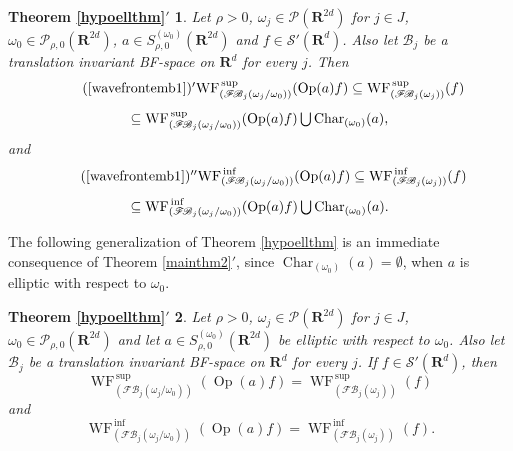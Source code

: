 \documentclass[12pt,a4paper,reqno]{amsart}
\numberwithin{equation}{section}
\numberwithin{thm}{section}
\newtheorem*{tom}{Theorem \ref{hypoellthm}$'$}
\theoremstyle{definition}
\theoremstyle{remark}
\begin{document}
\begin{tom}
Let $\rho >0$, $\omega _j\in \mathscr P({\mathbf R^{{2d}}})$ for $j\in J$, $\omega _0 \in \mathscr P_{\rho ,0}({\mathbf R^{{2d}}})$, $a\in S^{(\omega _0)}_{\rho ,0} ({\mathbf R^{{2d}}})$ and $f\in \mathscr
S'({\mathbf R^{d}})$. Also let $\mathscr B_j$ be a translation
invariant BF-space on ${\mathbf R^{d}}$ for every $j$. Then
\begin{multline}\tag*{(\ref{wavefrontemb1})$'$}
{\operatorname{WF}} ^{\, \sup}_{({\mathscr F\! \mathscr B} _j(\omega _j/\omega _0))} ({\operatorname{Op}} (a)f) \subseteq
{\operatorname{WF}} ^{\, \sup}_{({\mathscr F\! \mathscr B}_j (\omega _j))} (f)
\\[1ex]
\subseteq {\operatorname{WF}} ^{\, \sup}_{({\mathscr F\! \mathscr B} _j(\omega _j/\omega _0))} ({\operatorname{Op}}
(a)f){{\textstyle{\, \bigcup \, }}} {\operatorname{Char}} _{(\omega _0)}(a),
\end{multline}
and
\begin{multline}\tag*{(\ref{wavefrontemb1})$''$}
{\operatorname{WF}} ^{\, \inf}_{({\mathscr F\! \mathscr B} _j(\omega _j/\omega _0))} ({\operatorname{Op}} (a)f) \subseteq
{\operatorname{WF}} ^{\, \inf}_{({\mathscr F\! \mathscr B}_j (\omega _j))} (f)
\\[1ex]
\subseteq {\operatorname{WF}} ^{\, \inf}_{({\mathscr F\! \mathscr B} _j(\omega _j/\omega _0))} ({\operatorname{Op}} (a)f){{\textstyle{\, \bigcup \, }}}
{\operatorname{Char}} _{(\omega _0)}(a).
\end{multline}
\end{tom}

\par

The following generalization of Theorem \ref{hypoellthm} is an
immediate consequence of Theorem \ref{mainthm2}$'$, since ${\operatorname{Char}}
_{(\omega _0)}(a)=\emptyset$, when $a$ is elliptic with respect to
$\omega_0$.

\par

\begin{tom}

Let $\rho >0$, $\omega _j\in \mathscr P({\mathbf R^{{2d}}})$ for $j\in J$, $\omega _0 \in \mathscr P_{\rho ,0}({\mathbf R^{{2d}}})$ and let $a\in S^{(\omega _0)}_{\rho ,0} ({\mathbf R^{{2d}}})$ be elliptic
with respect to $\omega _0$.  Also let $\mathscr B_j$ be a translation
invariant BF-space on ${\mathbf R^{d}}$ for every $j$. If $f\in \mathscr S'({\mathbf R^{d}})$, then
$$
{\operatorname{WF}} ^{\, \sup}_{({\mathscr F\! \mathscr B} _j(\omega _j/\omega _0))} ({\operatorname{Op}} (a)f) =
{\operatorname{WF}} ^{\, \sup}_{({\mathscr F\! \mathscr B}_j (\omega _j))} (f)
$$
and 
$$
{\operatorname{WF}} ^{\, \inf}_{({\mathscr F\! \mathscr B} _j(\omega _j/\omega _0))} ({\operatorname{Op}} (a)f) =
{\operatorname{WF}} ^{\, \inf}_{({\mathscr F\! \mathscr B}_j (\omega _j))} (f).
$$

\end{tom}
\end{document}
